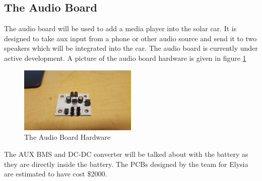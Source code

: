 \documentclass[titlepage]{article}
\begin{document}
    \subsection{The Audio Board}
    The audio board will be used to add a media player into the solar
    car. It is designed to take aux input from a phone or other audio
    source and send it to two speakers which will be integrated into the
    car. The audio board is currently under active development. A
    picture of the audio board hardware is given in figure
    \ref{fig:audio}
    \begin{figure}[H]
        \centering
        \includegraphics[width=0.5\textwidth]{images/audio_board.jpg}
        \caption{The Audio Board Hardware}
        \label{fig:audio}
    \end{figure}
    The AUX BMS and DC-DC converter will be talked about with the
    battery as they are directly inside the battery. The PCBs designed
    by the team for Elysia are estimated to have cost \$2000.

\end{document}
